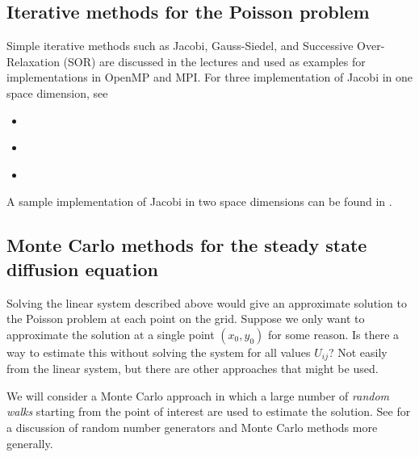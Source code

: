 \documentclass[letterpaper,10pt,english]{sphinxmanual}
\begin{document}
\subsection{Iterative methods for the Poisson problem}
\label{poisson:poisson-iter}\label{poisson:iterative-methods-for-the-poisson-problem}
Simple iterative methods such as Jacobi, Gauss-Siedel, and Successive
Over-Relaxation (SOR) are discussed in the lectures and used as examples for
implementations in OpenMP and MPI.  For three implementation of Jacobi in
one space dimension, see
\begin{itemize}
\item {} 
{\hyperref[jacobi1d_omp1:jacobi1d\string-omp1]{}}

\item {} 
{\hyperref[jacobi1d_omp2:jacobi1d\string-omp2]{}}

\item {} 
{\hyperref[jacobi1d_mpi:jacobi1d\string-mpi]{}}

\end{itemize}

A sample implementation of Jacobi in two space dimensions can be found
in .


\subsection{Monte Carlo methods for the steady state diffusion equation}
\label{poisson:poisson-mc}\label{poisson:monte-carlo-methods-for-the-steady-state-diffusion-equation}
Solving the linear system described above would give an approximate solution
to the Poisson problem at each point on the grid.  Suppose we only want to
approximate the solution at a single point \((x_0,y_0)\) for some reason.
Is there a way
to estimate this without solving the system for all values \(U_{ij}\)?
Not easily from the linear system, but there are other approaches that might
be used.

We will consider a Monte Carlo approach in which a large number of
\emph{random walks} starting from the point of interest are used to estimate the
solution.  See {\hyperref[random:random]{}} for a discussion of random number generators
and Monte Carlo methods more generally.
\end{document}
